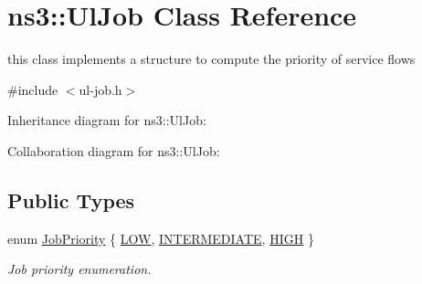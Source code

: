 \hypertarget{classns3_1_1UlJob}{}\section{ns3\+:\+:Ul\+Job Class Reference}
\label{classns3_1_1UlJob}


this class implements a structure to compute the priority of service flows  




{\ttfamily \#include $<$ul-\/job.\+h$>$}



Inheritance diagram for ns3\+:\+:Ul\+Job\+:


Collaboration diagram for ns3\+:\+:Ul\+Job\+:
\subsection*{Public Types}
\begin{DoxyCompactItemize}
\item 
enum \hyperlink{classns3_1_1UlJob_a6ae1d8e2e490a32ee1bc8aae661f4983}{Job\+Priority} \{ \hyperlink{classns3_1_1UlJob_a6ae1d8e2e490a32ee1bc8aae661f4983a092c552c374d3aecff410695b003d49d}{L\+OW}, 
\hyperlink{classns3_1_1UlJob_a6ae1d8e2e490a32ee1bc8aae661f4983a3619db7d63201ac367a111b38e443eea}{I\+N\+T\+E\+R\+M\+E\+D\+I\+A\+TE}, 
\hyperlink{classns3_1_1UlJob_a6ae1d8e2e490a32ee1bc8aae661f4983a5094609e73e947663a497fd927ce562e}{H\+I\+GH}
 \}\begin{DoxyCompactList}\small\item\em Job priority enumeration. \end{DoxyCompactList}
\end{DoxyCompactItemize}
